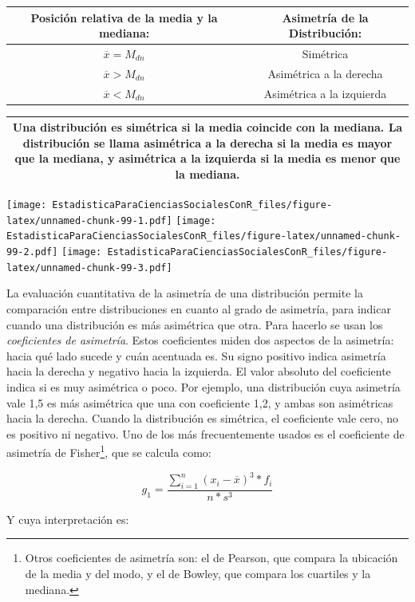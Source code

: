 \documentclass[]{book}
\let\rmarkdownfootnote\footnote%
\def\footnote{\protect\rmarkdownfootnote}
\begin{document}
\begin{longtable}[]{@{}cc@{}}
\toprule
Posición relativa de la media y la mediana: & Asimetría de la Distribución:\tabularnewline
\midrule
\endhead
\(\overline{x} = M_{dn}\) & Simétrica\tabularnewline
\(\overline{x} > M_{dn}\) & Asimétrica a la derecha\tabularnewline
\(\overline{x} < M_{dn}\) & Asimétrica a la izquierda\tabularnewline
\bottomrule
\end{longtable}

\begin{longtable}[]{@{}c@{}}
\toprule
\endhead
\begin{minipage}[t]{0.97\columnwidth}\centering
Una distribución es \textbf{simétrica} si la media coincide con la mediana. La distribución se llama asimétrica a la derecha si la media es mayor que la mediana, y asimétrica a la izquierda si la media es menor que la mediana.\strut
\end{minipage}\tabularnewline
\bottomrule
\end{longtable}

\texttt{[image: EstadisticaParaCienciasSocialesConR\_files/figure-latex/unnamed-chunk-99-1.pdf]} \texttt{[image: EstadisticaParaCienciasSocialesConR\_files/figure-latex/unnamed-chunk-99-2.pdf]} \texttt{[image: EstadisticaParaCienciasSocialesConR\_files/figure-latex/unnamed-chunk-99-3.pdf]}

La evaluación cuantitativa de la asimetría de una distribución permite la comparación entre distribuciones en cuanto al grado de asimetría, para indicar cuando una distribución es más asimétrica que otra. Para hacerlo se usan los \emph{coeficientes de asimetría}. Estos coeficientes miden dos aspectos
de la asimetría: hacia qué lado sucede y cuán acentuada es. Su signo
positivo indica asimetría hacia la derecha y negativo hacia la
izquierda. El valor absoluto del coeficiente indica si es muy asimétrica
o poco. Por ejemplo, una distribución cuya asimetría vale 1,5 es más
asimétrica que una con coeficiente 1,2, y ambas son asimétricas hacia la
derecha. Cuando la distribución es simétrica, el coeficiente vale cero,
no es positivo ni negativo. Uno de los más frecuentemente usados es el
coeficiente de asimetría de Fisher\footnote{Otros coeficientes de asimetría son: el de Pearson, que compara la ubicación de la media y del modo, y el de Bowley, que compara los cuartiles y la mediana.}, que se calcula como:

\[g_{1} = \frac{\sum_{i = 1}^{n}{\left( x_{i} - \overline{x} \right)^{3}*f_{i}}}{n*s^{3}}\]

Y cuya interpretación es:
\end{document}
